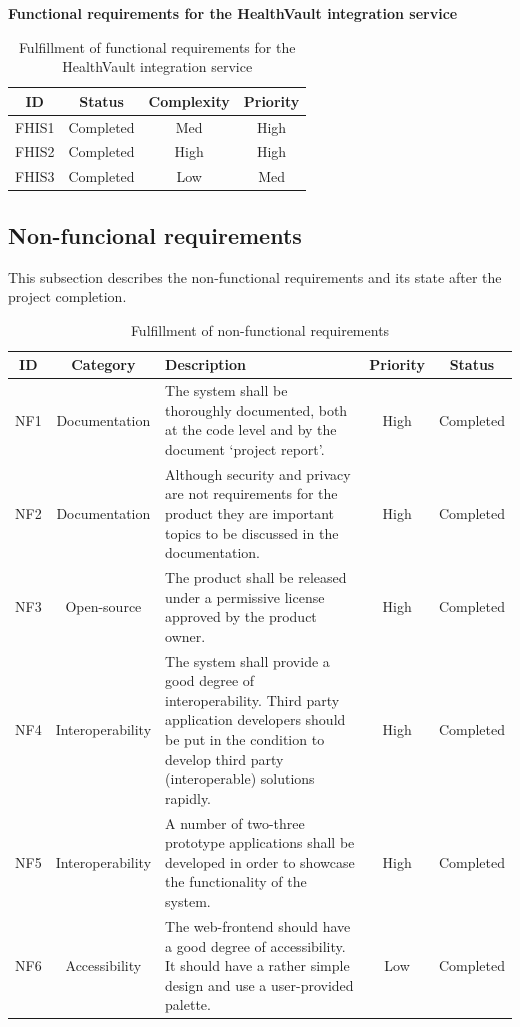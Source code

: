 \textbf{Functional requirements for the HealthVault integration service}

\begin{table}[H]
\begin{center}
\begin{tabular}{ | c | c | c | c |}
  \hline
  \textbf{ID} & \textbf{Status} & \textbf{Complexity} & \textbf{Priority}\\
  \hline\noalign{\smallskip}\hline
  FHIS1	& Completed & Med	& High \\
  FHIS2	& Completed & High	& High \\
  FHIS3	& Completed & Low	& Med \\
  \hline
\end{tabular}
\end{center}
\caption{Fulfillment of functional requirements for the HealthVault integration service}
\label{table:fulfillemntweightservice}
\end{table}

\subsection{Non-funcional requirements}
This subsection describes the non-functional requirements and its state after the project completion. 

\begin{table}[H]
\begin{center}
\begin{tabular}{ | c | c |p{6.5cm} | c | c |}
  \hline
  ID & Category & Description & Priority & Status\\
  \hline\noalign{\smallskip}\hline
  NF1 & Documentation & The system shall be thoroughly documented, both at the code level and by the document ‘project report’.
  & High & Completed \\
  NF2 & Documentation & Although security and privacy are not requirements for the product they are important topics to be discussed in the documentation.
  & High & Completed \\
  NF3 & Open-source	& The product shall be released under a permissive license approved by the product owner.
  & High & Completed \\
  NF4 & Interoperability & The system shall provide a good degree of interoperability. Third party application developers should be put in the condition to develop third party (interoperable) solutions rapidly.
  & High & Completed \\
  NF5 & Interoperability & A number of two-three prototype applications shall be developed in order to showcase the functionality of the system.
  & High & Completed \\
  NF6 & Accessibility & The web-frontend should have a good degree of accessibility. It should have a rather simple design and use a user-provided palette.
  & Low & Completed \\
  \hline
\end{tabular}
\end{center}
\caption{Fulfillment of non-functional requirements}
\label{table:fullfilmentnonfunctionalreq}
\end{table} 


